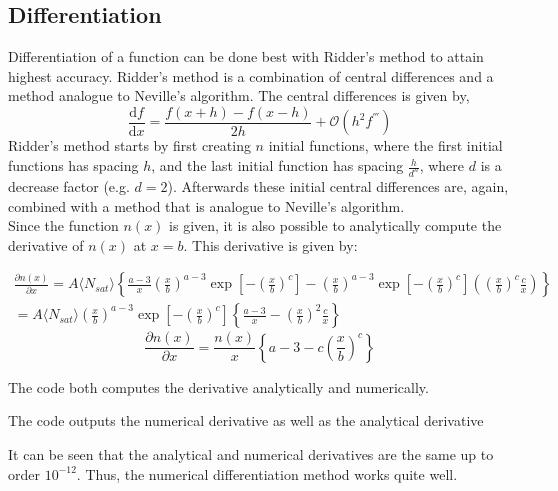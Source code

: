 \subsection{Differentiation}
Differentiation of a function can be done best with Ridder's method to attain highest accuracy. Ridder's method is a combination of central differences and a method analogue to Neville's algorithm. The central differences is given by,
\begin{equation*}
\frac{\mathrm{d}f}{\mathrm{d}x} = \frac{f(x+h) - f(x-h)}{2h} + \mathcal{O}(h^2f^{'''})
\end{equation*}
Ridder's method starts by first creating $n$ initial functions, where the first initial functions has spacing $h$, and the last initial function has spacing $\frac{h}{d^n}$, where $d$ is a decrease factor (e.g. $d = 2$). Afterwards these initial central differences are, again, combined with a method that is analogue to Neville's algorithm.\\

Since the function $n(x)$ is given, it is also possible to analytically compute the derivative of $n(x)$ at $x=b$. This derivative is given by:

\begin{gather*}
\frac{\partial n(x)}{\partial x} = A\langle N_{sat} \rangle \left\lbrace\frac{a-3}{x}\left(\frac{x}{b}\right)^{a-3} \exp\left[-\left(\frac{x}{b}\right)^c\right]- \left(\frac{x}{b}\right)^{a-3}\exp\left[-\left(\frac{x}{b}\right)^c\right]\left(\left(\frac{x}{b}\right)^c \frac{c}{x}\right)\right\rbrace\\
= A\langle N_{sat} \rangle \left(\frac{x}{b}\right)^{a-3}\exp\left[-\left(\frac{x}{b}\right)^c\right]\left\lbrace\frac{a-3}{x} - \left(\frac{x}{b} \right)^2\frac{c}{x}\right\rbrace
\end{gather*}
\begin{equation}
\frac{\partial n(x)}{\partial x}= \frac{n(x)}{x}\left\lbrace a-3-c\left(\frac{x}{b}\right)^c\right\rbrace
\end{equation}

The code both computes the derivative analytically and numerically. 



The code outputs the numerical derivative as well as the analytical derivative


It can be seen that the analytical and numerical derivatives are the same up to order $10^{-12}$. Thus, the numerical differentiation method works quite well.